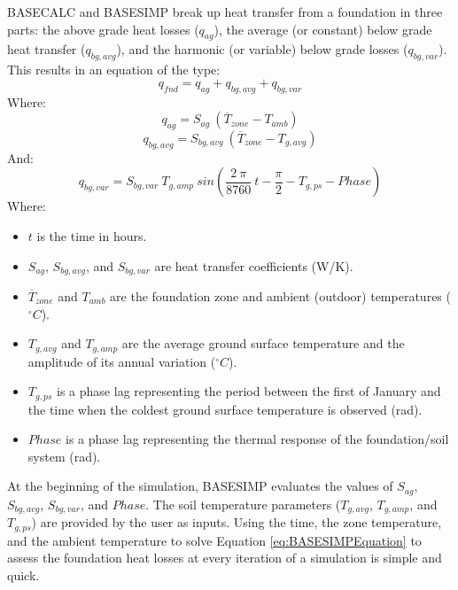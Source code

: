 BASECALC and BASESIMP break up heat transfer from a foundation in three parts: the above grade heat losses ($q_{ag}$), the average (or constant) below grade heat transfer ($q_{bg,avg}$), and the harmonic (or variable) below grade losses ($q_{bg,var}$).  This results in an equation of the type:
\begin{equation} \label{eq:BASESIMPEquation}
    q_{fnd} = q_{ag} + q_{bg,avg}  + q_{bg,var}
\end{equation}
Where:
\begin{equation} \label{eq:AGLossesEquation}
    q_{ag} = S_{ag} \: \left( \overline{T}_{zone} - T_{amb} \right)
\end{equation}
\begin{equation} \label{eq:BGAvgLossesEquation}
    q_{bg,avg} = S_{bg, avg} \: \left( \overline{T}_{zone} - T_{g,avg} \right)
\end{equation}
And:
\begin{equation} \label{eq:BGVarLossesEquation}
    q_{bg,var} = S_{bg, var} \: T_{g,amp} \: sin \left( \frac{2 \: \pi}{8760} \: t - \frac{\pi}{2} - T_{g,ps} - Phase \right)
\end{equation}
Where:
\begin{itemize}
    \item $t$ is the time in hours.
    \item $S_{ag}$, $S_{bg, avg}$, and $S_{bg, var}$ are heat transfer coefficients (W/K).
    \item $\overline{T}_{zone}$ and $T_{amb}$ are the foundation zone and ambient (outdoor) temperatures ($^{\circ}C$).
    \item $T_{g,avg}$ and $T_{g,amp}$ are the average ground surface temperature and the amplitude of its annual variation ($^{\circ}C$).
    \item $T_{g,ps}$ is a phase lag representing the period between the first of January and the time when the coldest ground surface temperature is observed (rad).
    \item $Phase$ is a phase lag representing the thermal response of the foundation/soil system (rad).
\end{itemize}

At the beginning of the simulation, BASESIMP evaluates the values of $S_{ag}$, $S_{bg,avg}$, $S_{bg,var}$, and {$Phase$}. The soil temperature parameters ($T_{g,avg}$, $T_{g,amp}$, and $T_{g,ps}$) are provided by the user as inputs.  Using the time, the zone temperature, and the ambient temperature to solve Equation \ref{eq:BASESIMPEquation} to assess the foundation heat losses at every iteration of a simulation is simple and quick.


